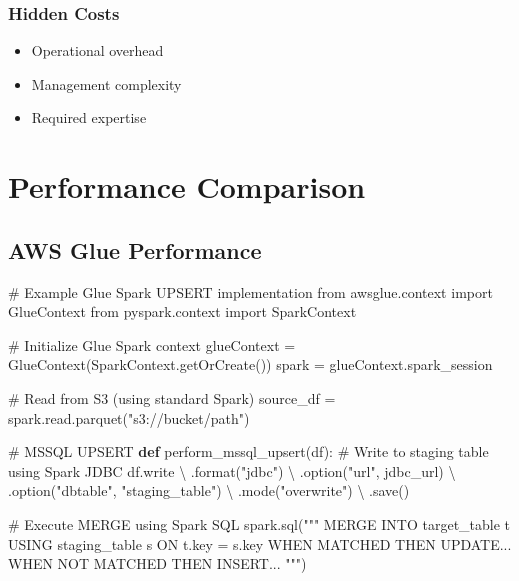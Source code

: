 \documentclass[
  letterpaper,
  DIV=11,
  numbers=noendperiod]{scrartcl}
\newenvironment{Shaded}{\begin{snugshade}}{\end{snugshade}}
\newcommand{\BuiltInTok}[1]{\textcolor[rgb]{0.00,0.23,0.31}{#1}}
\newcommand{\CommentTok}[1]{\textcolor[rgb]{0.37,0.37,0.37}{#1}}
\newcommand{\ImportTok}[1]{\textcolor[rgb]{0.00,0.46,0.62}{#1}}
\newcommand{\KeywordTok}[1]{\textcolor[rgb]{0.00,0.23,0.31}{\textbf{#1}}}
\newcommand{\NormalTok}[1]{\textcolor[rgb]{0.00,0.23,0.31}{#1}}
\newcommand{\OperatorTok}[1]{\textcolor[rgb]{0.37,0.37,0.37}{#1}}
\newcommand{\StringTok}[1]{\textcolor[rgb]{0.13,0.47,0.30}{#1}}
\providecommand{\tightlist}{%
  \setlength{\itemsep}{0pt}\setlength{\parskip}{0pt}}\usepackage{longtable,booktabs,array}
\begin{document}
\subsubsection{Hidden Costs}

\begin{itemize}
\tightlist
\item
  Operational overhead
\item
  Management complexity
\item
  Required expertise
\end{itemize}

\section{Performance Comparison}\label{performance-comparison}

\subsection{AWS Glue Performance}\label{aws-glue-performance}

\begin{Shaded}
\begin{Highlighting}[]
\CommentTok{\# Example Glue Spark UPSERT implementation}
\ImportTok{from}\NormalTok{ awsglue.context }\ImportTok{import}\NormalTok{ GlueContext}
\ImportTok{from}\NormalTok{ pyspark.context }\ImportTok{import}\NormalTok{ SparkContext}

\CommentTok{\# Initialize Glue Spark context}
\NormalTok{glueContext }\OperatorTok{=}\NormalTok{ GlueContext(SparkContext.getOrCreate())}
\NormalTok{spark }\OperatorTok{=}\NormalTok{ glueContext.spark\_session}

\CommentTok{\# Read from S3 (using standard Spark)}
\NormalTok{source\_df }\OperatorTok{=}\NormalTok{ spark.read.parquet(}\StringTok{"s3://bucket/path"}\NormalTok{)}

\CommentTok{\# MSSQL UPSERT}
\KeywordTok{def}\NormalTok{ perform\_mssql\_upsert(df):}
    \CommentTok{\# Write to staging table using Spark JDBC}
\NormalTok{    df.write }\OperatorTok{\textbackslash{}}
\NormalTok{        .}\BuiltInTok{format}\NormalTok{(}\StringTok{"jdbc"}\NormalTok{) }\OperatorTok{\textbackslash{}}
\NormalTok{        .option(}\StringTok{"url"}\NormalTok{, jdbc\_url) }\OperatorTok{\textbackslash{}}
\NormalTok{        .option(}\StringTok{"dbtable"}\NormalTok{, }\StringTok{"staging\_table"}\NormalTok{) }\OperatorTok{\textbackslash{}}
\NormalTok{        .mode(}\StringTok{"overwrite"}\NormalTok{) }\OperatorTok{\textbackslash{}}
\NormalTok{        .save()}

    \CommentTok{\# Execute MERGE using Spark SQL}
\NormalTok{    spark.sql(}\StringTok{"""}
\StringTok{    MERGE INTO target\_table t}
\StringTok{    USING staging\_table s}
\StringTok{    ON t.key = s.key}
\StringTok{    WHEN MATCHED THEN UPDATE...}
\StringTok{    WHEN NOT MATCHED THEN INSERT...}
\StringTok{    """}\NormalTok{)}
\end{Highlighting}
\end{Shaded}
\end{document}
